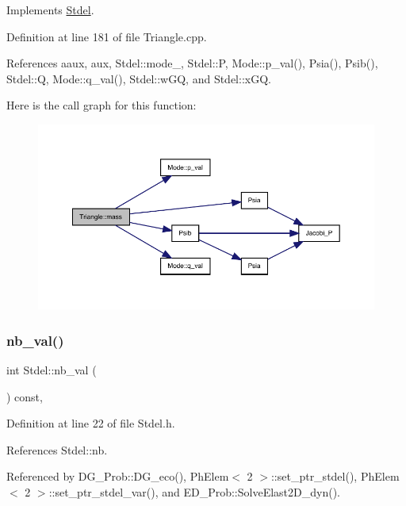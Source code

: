 Implements \hyperlink{classStdel_ab475cc8bc82a3b8a5200d4d841ef0a51}{Stdel}.



Definition at line 181 of file Triangle.\+cpp.



References aaux, aux, Stdel\+::mode\+\_\+, Stdel\+::P, Mode\+::p\+\_\+val(), Psia(), Psib(), Stdel\+::Q, Mode\+::q\+\_\+val(), Stdel\+::w\+GQ, and Stdel\+::x\+GQ.

Here is the call graph for this function\+:
\nopagebreak
\begin{figure}[H]
\begin{center}
\leavevmode
\includegraphics[width=350pt]{classTriangle_a6728c6239f7edbf04da7246cf0ee0c8c_cgraph}
\end{center}
\end{figure}
\mbox{\label{classStdel_a4fb0a049dc27d8e67665a56d1b5a18ba}} 
\subsubsection{\texorpdfstring{nb\+\_\+val()}{nb\_val()}}
{\footnotesize\ttfamily int Stdel\+::nb\+\_\+val (\begin{DoxyParamCaption}{ }\end{DoxyParamCaption}) const\hspace{0.3cm}{\ttfamily [inline]}, {\ttfamily [inherited]}}



Definition at line 22 of file Stdel.\+h.



References Stdel\+::nb.



Referenced by D\+G\+\_\+\+Prob\+::\+D\+G\+\_\+eco(), Ph\+Elem$<$ 2 $>$\+::set\+\_\+ptr\+\_\+stdel(), Ph\+Elem$<$ 2 $>$\+::set\+\_\+ptr\+\_\+stdel\+\_\+var(), and E\+D\+\_\+\+Prob\+::\+Solve\+Elast2\+D\+\_\+dyn().

